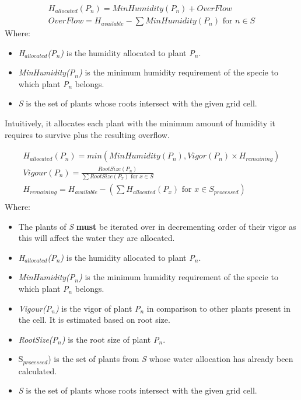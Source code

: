 \begin{equation}
\begin{split}
H_{allocated}(P_{n}) = MinHumidity(P_{n}) + OverFlow \\
OverFlow = H_{available} - \sum MinHumidity(P_{n}) \text{ for } n \in S
\end{split}
\label{eq:humidity_allocation_sufficient_calc}
\end{equation}
Where:
\begin{itemize}
\item \textit{H$_{allocated}$(P$_{n}$)} is the humidity allocated to plant \textit{P$_{n}$}.
\item \textit{MinHumidity(P$_{n}$)} is the minimum humidity requirement of the specie to which plant \textit{P$_{n}$} belongs.
\item \textit{S} is the set of plants whose roots intersect with the given grid cell.
\end{itemize}

Intuitively, it allocates each plant with the minimum amount of humidity it requires to survive plus the resulting overflow.

\begin{equation}
\begin{split}
H_{allocated}(P_{n}) = min(MinHumidity(P_{n}), Vigor(P_{n}) \times H_{remaining}) \\
Vigour(P_{n}) =  \frac{RootSize(P_{n})}{\sum RootSize(P_{x}) \text{ for } x \in S}\\
H_{remaining} = H_{available} - (\sum H_{allocated}(P_{x})  \text{ for } x \in S_{processed})\\
\end{split}
\label{eq:humidity_allocation_insufficient_calc}
\end{equation}
Where:
\begin{itemize}
\item The plants of \textit{S} \textbf{must} be iterated over in decrementing order of their vigor as this will affect the water they are allocated.
\item \textit{H$_{allocated}$(P$_{n}$)} is the humidity allocated to plant \textit{P$_{n}$}.
\item \textit{MinHumidity(P$_{n}$)} is the minimum humidity requirement of the specie to which plant \textit{P$_{n}$} belongs.
\item \textit{Vigour(P$_{n}$)} is the vigor of plant \textit{P$_{n}$} in comparison to other plants present in the cell. It is estimated based on root size.
\item \textit{RootSize(P$_{n}$)} is the root size of plant \textit{P$_{n}$}.
\item S$_{processed}$) is the set of plants from \textit{S} whose water allocation has already been calculated.
\item \textit{S} is the set of plants whose roots intersect with the given grid cell.
\end{itemize}


